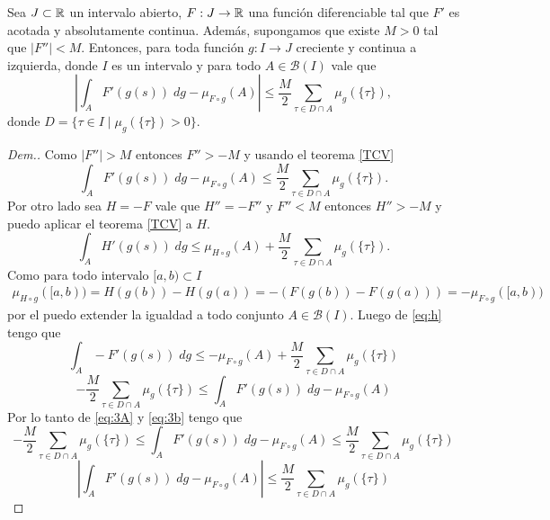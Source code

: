 \begin{thm}
    Sea $J\subset \mathbb{R}$ un intervalo abierto, $F:J\to \mathbb{R}$ una función diferenciable tal que $F'$ es acotada y absolutamente continua. Además, supongamos que existe $M>0$ tal que $|F''|<M$. Entonces, para toda función $g:I\to J$ creciente y continua a izquierda, donde $I$ es un intervalo y para todo $A\in \mathcal{B}(I)$ vale que
    \begin{equation}
        \left| \int_AF'(g(s)) \; dg  -\mu_{F\circ g}(A)\right|\leq \dfrac{M}{2}\sum_{\tau\in D\cap A}\mu_g(\{\tau \}),
    \end{equation}
    donde $D=\{\tau\in I \mid \mu_g(\{\tau\})>0\}$.
\end{thm}
\begin{proof}[Dem.]
    Como $|F''|>M$ entonces $F''>-M$ y usando el teorema \ref{TCV}
    \begin{equation}
    \int_AF'(g(s)) \; dg  -\mu_{F\circ g}(A)\leq \dfrac{M}{2}\sum_{\tau\in D\cap A}\mu_g(\{\tau \}).\label{eq:3A}
    \end{equation}
    Por otro lado sea $H=-F$ vale que $H''=-F''$ y $F''<M$ entonces
    $H''>-M$ y puedo aplicar el teorema \ref{TCV} a $H$. 
    \begin{equation}
        \int_A H'(g(s)) \; dg  \leq\mu_{H\circ g}(A)+ \dfrac{M}{2}\sum_{\tau\in D\cap A}\mu_g(\{\tau \}).\label{eq:h}
    \end{equation}
    Como para todo intervalo $[a,b)\subset I$
    \begin{multline*}
        \mu_{H\circ g}([a,b))=H(g(b))-H(g(a))=-\left( F(g(b))-F(g(a))\right)=-\mu_{F\circ g}([a,b))
    \end{multline*}
    por el  \cite[Lema 1.17]{folland} puedo extender la igualdad a todo conjunto $A\in\mathcal{B}(I)$. Luego de \ref{eq:h} tengo que
    \begin{equation*}
        \int_A -F'(g(s)) \; dg  \leq-\mu_{F\circ g}(A)+ \dfrac{M}{2}\sum_{\tau\in D\cap A}\mu_g(\{\tau \})
    \end{equation*}
    \begin{equation}
        - \dfrac{M}{2}\sum_{\tau\in D\cap A}\mu_g(\{\tau \})\leq \int_A F'(g(s)) \; dg  -\mu_{F\circ g}(A)\label{eq:3b}
    \end{equation}
Por lo tanto de \ref{eq:3A} y \ref{eq:3b} tengo que
\begin{equation*}
        - \dfrac{M}{2}\sum_{\tau\in D\cap A}\mu_g(\{\tau \})\leq \int_A F'(g(s)) \; dg  -\mu_{F\circ g}(A)\leq \dfrac{M}{2}\sum_{\tau\in D\cap A}\mu_g(\{\tau \})
    \end{equation*}
    $$\left| \int_A F'(g(s)) \; dg  -\mu_{F\circ g}(A)\right| \leq \dfrac{M}{2}\sum_{\tau\in D\cap A}\mu_g(\{\tau \})$$
\end{proof}



